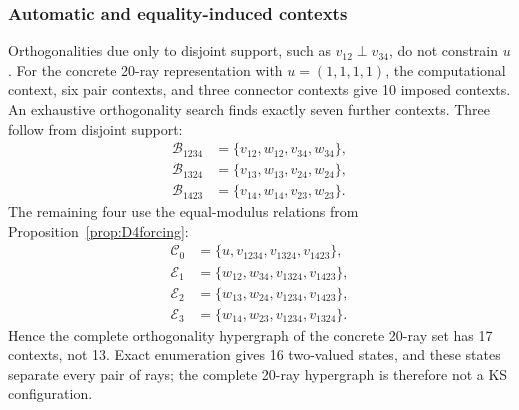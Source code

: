 \documentclass[%
  reprint,
  superscriptaddress,
  showpacs,
  showkeys,
  amsmath,amssymb,
  pra,
  longbibliography,
  floatfix,
  x11names
]{revtex4-2}
\newenvironment{revision}{\begingroup\color{revisionblue}}{\endgroup}
\begin{document}
\begin{revision}
\subsubsection{Automatic and equality-induced contexts}
Orthogonalities due only to disjoint support, such as $v_{12}\perp v_{34}$, do not constrain $u$.  For the concrete 20-ray representation with $u=(1,1,1,1)$, the computational context, six pair contexts, and three connector contexts give 10 imposed contexts.  An exhaustive orthogonality search finds exactly seven further contexts.  Three follow from disjoint support:
\begin{align*}
\mathcal{B}_{1234}&=\{v_{12},w_{12},v_{34},w_{34}\},\\
\mathcal{B}_{1324}&=\{v_{13},w_{13},v_{24},w_{24}\},\\
\mathcal{B}_{1423}&=\{v_{14},w_{14},v_{23},w_{23}\}.
\end{align*}
The remaining four use the equal-modulus relations from Proposition~\ref{prop:D4forcing}:
\begin{align*}
\mathcal{C}_0&=\{u,v_{1234},v_{1324},v_{1423}\},\\
\mathcal{E}_1&=\{w_{12},w_{34},v_{1324},v_{1423}\},\\
\mathcal{E}_2&=\{w_{13},w_{24},v_{1234},v_{1423}\},\\
\mathcal{E}_3&=\{w_{14},w_{23},v_{1234},v_{1324}\}.
\end{align*}
Hence the complete orthogonality hypergraph of the concrete 20-ray set has 17 contexts, not 13.  Exact enumeration gives 16 two-valued states, and these states separate every pair of rays; the complete 20-ray hypergraph is therefore not a KS configuration.
\end{revision}
\end{document}
